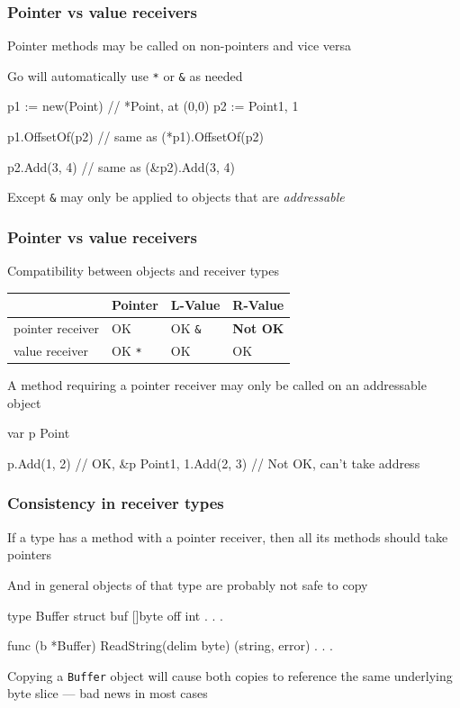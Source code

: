 \documentclass[handout,compress,t,11pt]{beamer}
\begin{document}
\begin{frame}[fragile]
    \frametitle{Pointer vs value receivers}
    Pointer methods may be called on non-pointers and vice versa \par
    \vspace{\baselineskip}
    Go will automatically use \verb|*| or \verb|&| as needed \par
\begin{golang}
p1 := new(Point)     // *Point, at (0,0)
p2 := Point{1, 1}

p1.OffsetOf(p2)      // same as (*p1).OffsetOf(p2)

p2.Add(3, 4)         // same as (&p2).Add(3, 4)
\end{golang}
\vspace{2\baselineskip}
Except \verb|&| may only be applied to objects that are {\em addressable}
\end{frame}

\begin{frame}[fragile]
    \frametitle{Pointer vs value receivers}
    Compatibility between objects and receiver types \par
\begin{center}
\begin{table}[h!]
{\renewcommand{\arraystretch}{1.7}%
    \begin{tabular}{l|l|l|l}
    & \textbf{Pointer} & \textbf{L-Value} & \textbf{R-Value} \\
    \hline
    pointer receiver & OK & OK \verb|&| & \alert{\bf Not OK}  \\
    \hline
    value receiver & OK \verb|*| & OK & OK
    \end{tabular}}
\end{table}
\end{center}
A method requiring a pointer receiver may only be called on an addressable object
\begin{golang}
var p Point

p.Add(1, 2)               // OK, &p
Point{1, 1}.Add(2, 3)     // Not OK, can't take address
\end{golang}
\end{frame}

\begin{frame}[fragile]
    \frametitle{Consistency in receiver types}
    If a type has a method with a pointer receiver, then all its methods
    should take pointers \par
    \vspace{0.4\baselineskip}
    And in general objects of that type are probably not safe to copy
\begin{golang}
type Buffer struct {
	buf       []byte
	off       int
    . . .
}

func (b *Buffer) ReadString(delim byte) (string, error) {
	. . .
}
\end{golang}
Copying a \verb|Buffer| object will cause both copies to reference the same
underlying byte slice --- bad news in most cases
\end{frame}
\end{document}
